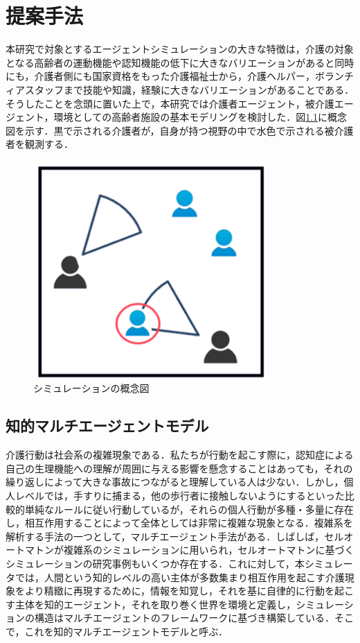 \chapter{提案手法}

本研究で対象とするエージェントシミュレーションの大きな特徴は，介護の対象となる高齢者の運動機能や認知機能の低下に大きなバリエーションがあると同時にも，介護者側にも国家資格をもった介護福祉士から，介護ヘルパー，ボランチィアスタッフまで技能や知識，経験に大きなバリエーションがあることである．そうしたことを念頭に置いた上で，本研究では介護者エージェント，被介護エージェント，環境としての高齢者施設の基本モデリングを検討した．図\ref{concept_simulation}に概念図を示す．黒で示される介護者が，自身が持つ視野の中で水色で示される被介護者を観測する．

\begin{figure}[htb]
\begin{center}
\includegraphics[scale=1.4]{figures/concept_simulation.png}
\caption[シミュレーションの概念図]{シミュレーションの概念図 \label{concept_simulation}}
\end{center}
\end{figure}

\section{知的マルチエージェントモデル}

介護行動は社会系の複雑現象である．私たちが行動を起こす際に，認知症による自己の生理機能への理解が周囲に与える影響を懸念することはあっても，それの繰り返しによって大きな事故につながると理解している人は少ない．しかし，個人レベルでは，手すりに捕まる，他の歩行者に接触しないようにするといった比較的単純なルールに従い行動しているが，それらの個人行動が多種・多量に存在し，相互作用することによって全体としては非常に複雑な現象となる．複雑系を解析する手法の一つとして，マルチエージェント手法がある．しばしば，セルオートマトンが複雑系のシミュレーションに用いられ，セルオートマトンに基づくシミュレーションの研究事例もいくつか存在する．これに対して，本シミュレータでは，人間という知的レベルの高い主体が多数集まり相互作用を起こす介護現象をより精緻に再現するために，情報を知覚し，それを基に自律的に行動を起こす主体を知的エージェント，それを取り巻く世界を環境と定義し，シミュレーションの構造はマルチエージェントのフレームワークに基づき構築している．そこで，これを知的マルチエージェントモデルと呼ぶ．

